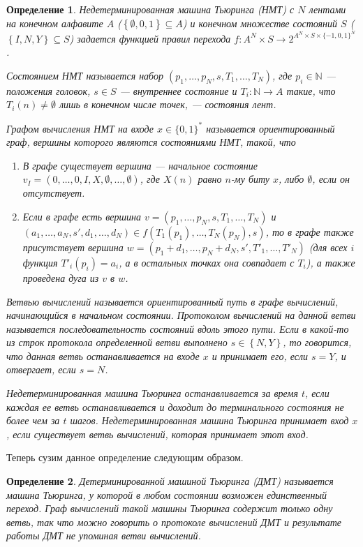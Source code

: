 \documentclass[14pt, a4paper]{extreport}
\newtheorem{definition}{\indent Определение}
\newcommand{\word}{\{0, 1\}^*}
\newcommand{\set}[1]{\left\{#1\right\}}
\begin{document}
\begin{definition}Недетерминированная машина Тьюринга (НМТ) с $N$ лентами на конечном алфавите $A$ ($\set{\emptyset, 0, 1} \subseteq A$) и конечном множестве состояний $S$ ($\set{I, N, Y} \subseteq S$) задается функцией правил перехода $f: A^N \times S \longrightarrow 2^{A^N \times S \times \{-1, 0, 1\}^N}$.

Состоянием НМТ называется набор $\left(p_1, \ldots, p_N, s, T_1, \ldots, T_N\right)$, где $p_i \in \mathbb{N}$ --- положения головок, $s \in S$ --- внутреннее состояние и $T_i: \mathbb{N} \longrightarrow A$ такие, что $T_i(n) \neq \emptyset$ лишь в конечном числе точек, --- состояния лент.

Графом вычисления НМТ на входе $x \in \word$ называется ориентированный граф, вершины которого являются состояниями НМТ, такой, что
\begin{enumerate}
    \item В графе существует вершина --- начальное состояние $v_I = \left(0, \ldots, 0, I, X, \emptyset, \ldots, \emptyset\right)$, где $X(n)$ равно $n$-му биту $x$, либо $\emptyset$, если он отсутствует.
    \item Если в графе есть вершина $v = \left(p_1, \ldots, p_N, s, T_1, \ldots, T_N\right)$ и $(a_1, \ldots, a_N,  s', d_1, \ldots, d_N) \in f(T_1(p_1), \ldots, T_N(p_N), s)$, то в графе также присутствует вершина $w = \left(p_1 + d_1, \ldots, p_N + d_N, s', T'_1, \ldots, T'_N\right)$ (для всех $i$ функция $T'_i(p_i) = a_i$, а в остальных точках она совпадает с $T_i$), а также проведена дуга из $v$ в $w$.
\end{enumerate}

Ветвью вычислений называется ориентированный путь в графе вычислений, начинающийся в начальном состоянии. Протоколом вычислений на данной ветви называется последовательность состояний вдоль этого пути.
Если в какой-то из строк протокола определенной ветви выполнено $s \in \set{N, Y}$, то говорится, что данная ветвь останавливается на входе $x$ и принимает его, если $s = Y$, и отвергает, если $s = N$. 

Недетерминированная машина Тьюринга останавливается за время $t$, если каждая ее ветвь останавливается и доходит до терминального состояния не более чем за $t$ шагов. 
Недетерминированная машина Тьюринга принимает вход $x$, если существует ветвь вычислений, которая принимает этот вход.
\end{definition}
Теперь сузим данное определение следующим образом.
\begin{definition}
    Детерминированной машиной Тьюринга (ДМТ) называется машина Тьюринга, у которой в любом состоянии возможен единственный переход. Граф вычислений такой машины Тьюринга содержит только одну ветвь, так что можно говорить о протоколе вычислений ДМТ и результате работы ДМТ не упоминая ветви вычислений.
\end{definition}
\end{document}
